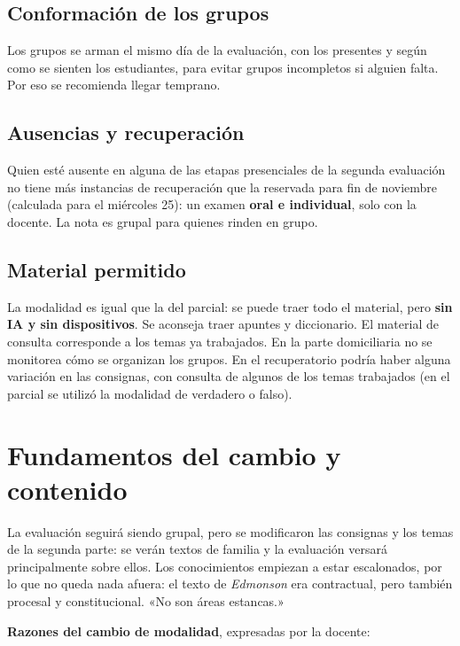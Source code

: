 \documentclass[12pt,oneside]{book}
\begin{document}
\subsection{Conformación de los grupos}

Los grupos se arman el mismo día de la evaluación, con los presentes y según como se sienten los estudiantes, para evitar grupos incompletos si alguien falta. Por eso se recomienda llegar temprano.

\subsection{Ausencias y recuperación}

\begin{important}
Quien esté ausente en alguna de las etapas presenciales de la segunda evaluación no tiene más instancias de recuperación que la reservada para fin de noviembre (calculada para el miércoles 25): un examen \textbf{oral e individual}, solo con la docente. La nota es grupal para quienes rinden en grupo.
\end{important}

\subsection{Material permitido}

La modalidad es igual que la del parcial: se puede traer todo el material, pero \textbf{sin IA y sin dispositivos}. Se aconseja traer apuntes y diccionario. El material de consulta corresponde a los temas ya trabajados. En la parte domiciliaria no se monitorea cómo se organizan los grupos. En el recuperatorio podría haber alguna variación en las consignas, con consulta de algunos de los temas trabajados (en el parcial se utilizó la modalidad de verdadero o falso).

\section{Fundamentos del cambio y contenido}

La evaluación seguirá siendo grupal, pero se modificaron las consignas y los temas de la segunda parte: se verán textos de familia y la evaluación versará principalmente sobre ellos. Los conocimientos empiezan a estar escalonados, por lo que no queda nada afuera: el texto de \textit{Edmonson} era contractual, pero también procesal y constitucional. «No son áreas estancas.»

\textbf{Razones del cambio de modalidad}, expresadas por la docente:
\end{document}
